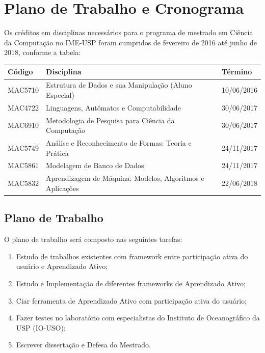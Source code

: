 \chapter{Plano de Trabalho e Cronograma}
\label{cap:Cronogramanotes}

Os créditos em disciplinas necessários para o programa de mestrado em Ciência da Computação
no IME-USP foram cumpridos de fevereiro de 2016 até junho de 2018, conforme a tabela: 

\begin{center}
\begin{tabular}{ |l|l|l| } 
\hline
\textbf{Código} & \textbf{Disciplina}                                   & \textbf{Término} \\ 
\hline
MAC5710     & Estrutura de Dados e sua Manipulação (Aluno Especial)     & 10/06/2016       \\
MAC4722     & Linguagens, Autômatos e Computabilidade                   & 30/06/2017       \\
MAC6910     & Metodologia de Pesquisa para Ciência da Computação        & 30/06/2017       \\
MAC5749     & Análise e Reconhecimento de Formas: Teoria e Prática      & 24/11/2017       \\
MAC5861     & Modelagem de Banco de Dados                               & 24/11/2017       \\
MAC5832     & Aprendizagem de Máquina: Modelos, Algoritmos e Aplicações & 22/06/2018       \\
\hline
\end{tabular}
\end{center}

\section{Plano de Trabalho}
\label{sec:Plano_de_Trabalho}

O plano de trabalho será composto nas seguintes tarefas:

\begin{enumerate}
  \item Estudo de trabalhos existentes com framework entre participação ativa do usuário e Aprendizado Ativo;
  \item Estudo e Implementação de diferentes frameworks de Aprendizado Ativo;
  \item Ciar ferramenta de Aprendizado Ativo com participação ativa do usuário;
  \item Fazer testes no laboratório com especialistas do Instituto de Oceanográfico da USP (IO-USO);
  \item Escrever dissertação e Defesa do Mestrado.
\end{enumerate}


